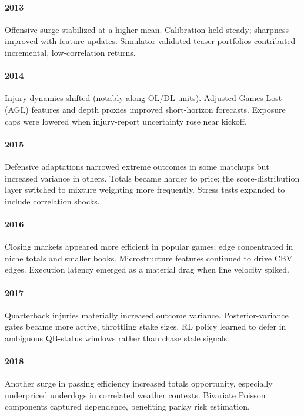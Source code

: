 \documentclass[12pt]{report}  %
\numberwithin{equation}{section}
\theoremstyle{plain}
\theoremstyle{definition}
\theoremstyle{remark}
\begin{document}
\paragraph{2013} Offensive surge stabilized at a higher mean. Calibration held steady; sharpness improved with feature updates. Simulator-validated teaser portfolios contributed incremental, low-correlation returns.

\paragraph{2014} Injury dynamics shifted (notably along OL/DL units). Adjusted Games Lost (AGL) features and depth proxies improved short-horizon forecasts. Exposure caps were lowered when injury-report uncertainty rose near kickoff.

\paragraph{2015} Defensive adaptations narrowed extreme outcomes in some matchups but increased variance in others. Totals became harder to price; the score-distribution layer switched to mixture weighting more frequently. Stress tests expanded to include correlation shocks.

\paragraph{2016} Closing markets appeared more efficient in popular games; edge concentrated in niche totals and smaller books. Microstructure features continued to drive CBV edges. Execution latency emerged as a material drag when line velocity spiked.

\paragraph{2017} Quarterback injuries materially increased outcome variance. Posterior-variance gates became more active, throttling stake sizes. RL policy learned to defer in ambiguous QB-status windows rather than chase stale signals.

\paragraph{2018} Another surge in passing efficiency increased totals opportunity, especially underpriced underdogs in correlated weather contexts. Bivariate Poisson components captured dependence, benefiting parlay risk estimation.
\end{document}
